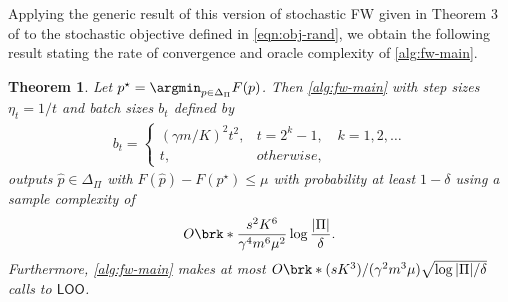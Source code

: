 \documentclass[11pt]{article}
\newcommand{\loo}{\textsf{LOO}}
\newcommand{\obj}{F}
\theoremstyle{plain}
\newtheorem{theorem}{Theorem}
\begin{document}
Applying the generic result of this version of stochastic FW given in Theorem 3 of \cite{erez2024fast} to the stochastic objective defined in \cref{eqn:obj-rand}, we obtain the following result stating the rate of convergence and oracle complexity of \cref{alg:fw-main}.

\begin{theorem}
\label{thm:fw-conv}
    Let $p^\star = \argmin_{p \in \Delta_{\Pi}} \obj(p)$. Then \cref{alg:fw-main} with step sizes $\eta_t = 1/t$ and batch sizes $b_t$ defined by
    \begin{align*}
        b_t = 
        \begin{cases}
            (\gamma m / K)^2 t^2, & t=2^k-1, \quad k=1,2,\ldots \\
            t, & otherwise,
        \end{cases}
    \end{align*}
    outputs $\hat p \in \Delta_\Pi$ with $\obj(\hat p) - \obj(p^\star)  \leq \mu$ with probability at least $1-\delta$ using a sample complexity of 
    \begin{align*}
        O \brk*{\frac{s^2 K^6}{\gamma^4 m^6 \mu^2} \log \frac{|\Pi|}{\delta}}.
    \end{align*}
    Furthermore, \cref{alg:fw-main} makes at most $O \brk*{(s K^3) / (\gamma^2 m^3 \mu) \sqrt{\log |\Pi| / \delta}}$ calls to $\loo$.
\end{theorem}
\end{document}
